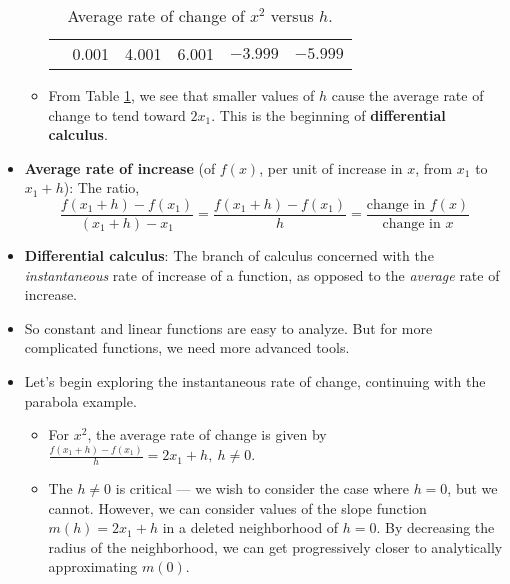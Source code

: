 \documentclass[../main.tex]{subfiles}
\begin{document}
\begin{itemize}
\begin{itemize}
\begin{table}[h!]
\begin{tabular}{r|l|l|l|l|l}
                 & 0.001 & 4.001 & 6.001 & $-3.999$ & $-5.999$
            \end{tabular}
            \caption{Average rate of change of $x^2$ versus $h$.}
            \label{tab:2x1+h}
        \end{table}
        \item From Table \ref{tab:2x1+h}, we see that smaller values of $h$ cause the average rate of change to tend toward $2x_1$. This is the beginning of \textbf{differential calculus}.
    \end{itemize}
    \item \textbf{Average rate of increase} (of $f(x)$, per unit of increase in $x$, from $x_1$ to $x_1+h$): The ratio,
    \begin{equation*}
        \frac{f(x_1+h)-f(x_1)}{(x_1+h)-x_1} = \frac{f(x_1+h)-f(x_1)}{h}
        = \frac{\text{change in }f(x)}{\text{change in }x}
    \end{equation*}
    \item \textbf{Differential calculus}: The branch of calculus concerned with the \emph{instantaneous} rate of increase of a function, as opposed to the \emph{average} rate of increase.
    \item So constant and linear functions are easy to analyze. But for more complicated functions, we need more advanced tools.
    \item Let's begin exploring the instantaneous rate of change, continuing with the parabola example.
    \begin{itemize}
        \item For $x^2$, the average rate of change is given by $\frac{f(x_1+h)-f(x_1)}{h}=2x_1+h,\ h\neq 0$.
        \item The $h\neq 0$ is critical --- we wish to consider the case where $h=0$, but we cannot. However, we can consider values of the slope function $m(h)=2x_1+h$ in a deleted neighborhood of $h=0$. By decreasing the radius of the neighborhood, we can get progressively closer to analytically approximating $m(0)$.
        \begin{figure}[h!]
            \centering
\end{figure}
\end{itemize}
\end{itemize}
\end{document}
